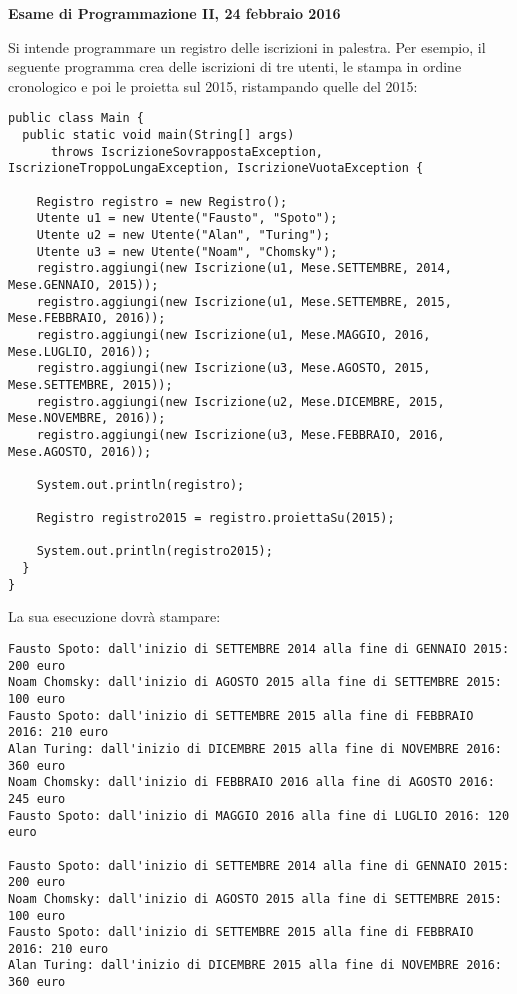 \documentclass{article}[10pt]
\begin{document}
\begin{center} {\bf Esame di Programmazione II, 24 febbraio 2016}\end{center}

Si intende programmare un registro delle iscrizioni in palestra. Per esempio, il
seguente programma crea delle iscrizioni di tre utenti, le stampa in ordine cronologico
e poi le proietta sul 2015, ristampando quelle del 2015:

{\small\begin{verbatim}
public class Main {
  public static void main(String[] args)
      throws IscrizioneSovrappostaException, IscrizioneTroppoLungaException, IscrizioneVuotaException {

    Registro registro = new Registro();
    Utente u1 = new Utente("Fausto", "Spoto");
    Utente u2 = new Utente("Alan", "Turing");
    Utente u3 = new Utente("Noam", "Chomsky");
    registro.aggiungi(new Iscrizione(u1, Mese.SETTEMBRE, 2014, Mese.GENNAIO, 2015));
    registro.aggiungi(new Iscrizione(u1, Mese.SETTEMBRE, 2015, Mese.FEBBRAIO, 2016));
    registro.aggiungi(new Iscrizione(u1, Mese.MAGGIO, 2016, Mese.LUGLIO, 2016));
    registro.aggiungi(new Iscrizione(u3, Mese.AGOSTO, 2015, Mese.SETTEMBRE, 2015));
    registro.aggiungi(new Iscrizione(u2, Mese.DICEMBRE, 2015, Mese.NOVEMBRE, 2016));
    registro.aggiungi(new Iscrizione(u3, Mese.FEBBRAIO, 2016, Mese.AGOSTO, 2016));
    
    System.out.println(registro);

    Registro registro2015 = registro.proiettaSu(2015);

    System.out.println(registro2015);
  }
}
\end{verbatim}
}

\noindent
La sua esecuzione dovr\`a stampare:

{\small\begin{verbatim}
Fausto Spoto: dall'inizio di SETTEMBRE 2014 alla fine di GENNAIO 2015: 200 euro
Noam Chomsky: dall'inizio di AGOSTO 2015 alla fine di SETTEMBRE 2015: 100 euro
Fausto Spoto: dall'inizio di SETTEMBRE 2015 alla fine di FEBBRAIO 2016: 210 euro
Alan Turing: dall'inizio di DICEMBRE 2015 alla fine di NOVEMBRE 2016: 360 euro
Noam Chomsky: dall'inizio di FEBBRAIO 2016 alla fine di AGOSTO 2016: 245 euro
Fausto Spoto: dall'inizio di MAGGIO 2016 alla fine di LUGLIO 2016: 120 euro

Fausto Spoto: dall'inizio di SETTEMBRE 2014 alla fine di GENNAIO 2015: 200 euro
Noam Chomsky: dall'inizio di AGOSTO 2015 alla fine di SETTEMBRE 2015: 100 euro
Fausto Spoto: dall'inizio di SETTEMBRE 2015 alla fine di FEBBRAIO 2016: 210 euro
Alan Turing: dall'inizio di DICEMBRE 2015 alla fine di NOVEMBRE 2016: 360 euro
\end{verbatim}}
\end{document}
